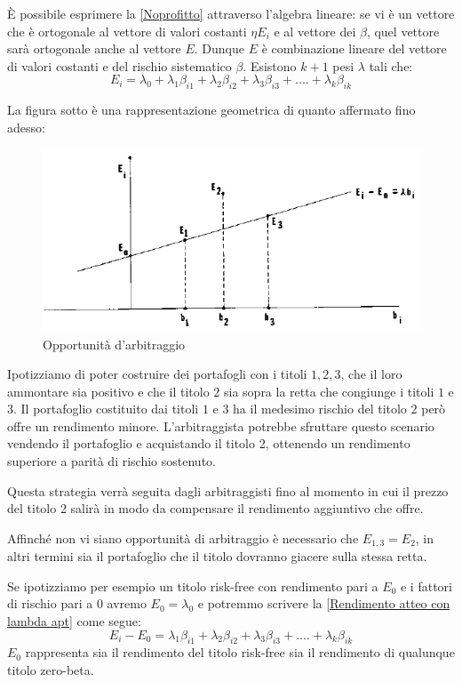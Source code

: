 \`E possibile esprimere la \ref{Noprofitto} attraverso l'algebra lineare: se vi è un vettore che è ortogonale al vettore di valori costanti $\eta E_i$ e al vettore dei $\beta$, quel vettore sarà ortogonale anche al vettore $E$. Dunque $E$ è combinazione lineare del vettore di valori costanti e del rischio sistematico $\beta$. Esistono $k+1$ pesi $\lambda$ tali che: 
\begin{equation}
\label{Rendimento atteo con lambda apt}
E_i=\lambda_0+\lambda_1\beta_{i1}+\lambda_2\beta_{i2}+\lambda_3\beta_{i3}+....+\lambda_k\beta_{ik}
\end{equation}

La figura sotto è una rappresentazione geometrica di quanto affermato fino adesso:

\begin{figure}[h!]
	\centering
	\includegraphics[width=0.6\linewidth]{"imgs/arbitraggio 2"}
	\caption{Opportunità d'arbitraggio}
	\label{fig:arbitraggio-2}
\end{figure}
	

Ipotizziamo di poter costruire dei portafogli con i titoli $1,2,3$, che il loro ammontare sia positivo e che il titolo $2$ sia sopra la retta che congiunge i titoli $1$ e $3$. Il portafoglio costituito dai titoli $1$ e $3$ ha il medesimo rischio del titolo $2$ però offre un rendimento minore. L'arbitraggista potrebbe sfruttare questo scenario vendendo il portafoglio e acquistando il titolo 2, ottenendo un rendimento superiore a parità di rischio sostenuto.

Questa strategia verrà seguita dagli arbitraggisti fino al momento in cui il prezzo del titolo 2 salirà in modo da compensare il rendimento aggiuntivo che offre. 

Affinché non vi siano opportunità di arbitraggio è necessario che $E_{1,3}=E_2$, in altri termini sia il portafoglio che il titolo dovranno giacere sulla stessa retta. 

Se ipotizziamo per esempio un titolo risk-free con rendimento pari a $E_0$ e i fattori di rischio pari a 0 avremo $E_0=\lambda_0$ e potremmo scrivere la \ref{Rendimento atteo con lambda apt} come segue:
\begin{equation}
\label{Rendimentoapt}
E_i-E_0= \lambda_1\beta_{i1}+\lambda_2\beta_{i2}+\lambda_3\beta_{i3}+....+\lambda_k\beta_{ik}
\end{equation}
$E_0$ rappresenta sia il rendimento del titolo risk-free sia il rendimento di qualunque titolo zero-beta.

